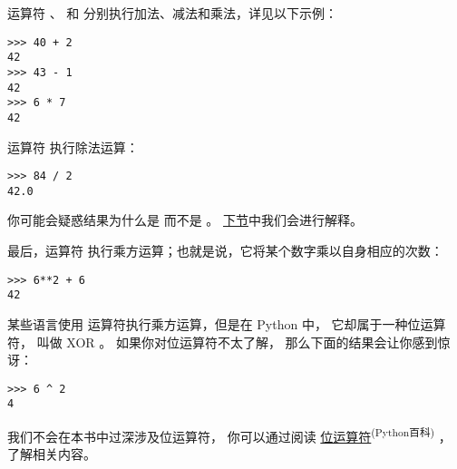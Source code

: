 运算符 \li{+} 、\li{-} 和 \li{*} 分别执行加法、减法和乘法，详见以下示例：

\begin{lstlisting}
>>> 40 + 2
42
>>> 43 - 1
42
>>> 6 * 7
42
\end{lstlisting}

%

运算符 \li{/} 执行除法运算：


\begin{lstlisting}
>>> 84 / 2
42.0
\end{lstlisting}

%

你可能会疑惑结果为什么是  而不是  。 \hyperref[value_types]{下节}中我们会进行解释。


最后，运算符 \li{*} 执行乘方运算；也就是说，它将某个数字乘以自身相应的次数：

\begin{lstlisting}
>>> 6**2 + 6
42
\end{lstlisting}


%

某些语言使用 \li{^} 运算符执行乘方运算，但是在 Python 中， 它却属于一种位运算符， 叫做 XOR 。 如果你对位运算符不太了解， 那么下面的结果会让你感到惊讶：

\begin{lstlisting}
>>> 6 ^ 2
4
\end{lstlisting}

%

我们不会在本书中过深涉及位运算符， 你可以通过阅读 \href{http://wiki.python.org/moin/BitwiseOperators}{位运算符}\textsuperscript{(Python百科)} ， 了解相关内容。
  
  


